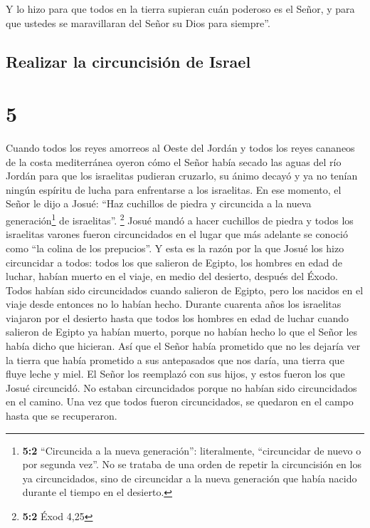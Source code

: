  Y lo hizo para que todos en la tierra supieran cuán
poderoso es el Señor, y para que ustedes se maravillaran del Señor su
Dios para siempre''.

\hypertarget{realizar-la-circuncisiuxf3n-de-israel}{%
\subsection{Realizar la circuncisión de
Israel}\label{realizar-la-circuncisiuxf3n-de-israel}}

\hypertarget{section-4}{%
\section{5}\label{section-4}}

 Cuando todos los reyes amorreos al Oeste del Jordán y
todos los reyes cananeos de la costa mediterránea oyeron cómo el Señor
había secado las aguas del río Jordán para que los israelitas pudieran
cruzarlo, su ánimo decayó y ya no tenían ningún espíritu de lucha para
enfrentarse a los israelitas.  En ese momento, el Señor le
dijo a Josué: ``Haz cuchillos de piedra y circuncida a la nueva
generación\footnote{\textbf{5:2} ``Circuncida a la nueva generación'':
  literalmente, ``circuncidar de nuevo o por segunda vez''. No se
  trataba de una orden de repetir la circuncisión en los ya
  circuncidados, sino de circuncidar a la nueva generación que había
  nacido durante el tiempo en el desierto.} de israelitas''. \footnote{\textbf{5:2}
  Éxod 4,25}  Josué mandó a hacer cuchillos de piedra y
todos los israelitas varones fueron circuncidados en el lugar que más
adelante se conoció como ``la colina de los prepucios''. 
Y esta es la razón por la que Josué los hizo circuncidar a todos: todos
los que salieron de Egipto, los hombres en edad de luchar, habían muerto
en el viaje, en medio del desierto, después del Éxodo. 
Todos habían sido circuncidados cuando salieron de Egipto, pero los
nacidos en el viaje desde entonces no lo habían hecho. 
Durante cuarenta años los israelitas viajaron por el desierto hasta que
todos los hombres en edad de luchar cuando salieron de Egipto ya habían
muerto, porque no habían hecho lo que el Señor les había dicho que
hicieran. Así que el Señor había prometido que no les dejaría ver la
tierra que había prometido a sus antepasados que nos daría, una tierra
que fluye leche y miel.  El Señor los reemplazó con sus
hijos, y estos fueron los que Josué circuncidó. No estaban circuncidados
porque no habían sido circuncidados en el camino.  Una vez
que todos fueron circuncidados, se quedaron en el campo hasta que se
recuperaron.


